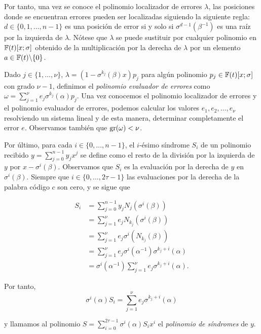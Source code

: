 Por tanto, una vez se conoce el polinomio localizador de errores $\lambda$, las posiciones donde se encuentran errores pueden ser localizadas siguiendo la siguiente regla: $d \in \{0,1,\dots,n-1\}$ es una posición de error si y solo si $\sigma^{d-1}(\beta^{-1})$ es una raíz por la izquierda de $\lambda$. Nótese que $\lambda$ se puede sustituir por cualquier polinomio en $\mathbb{F}(t)[x;\sigma]$ obtenido de la multiplicación por la derecha de $\lambda$ por un elemento $a \in \mathbb{F}(t)\backslash \{0\}$.

Dado $j \in \{1,\dots,\nu\}$, $\lambda = (1 - \sigma^{k_j}(\beta)x)p_j$ para algún polinomio $p_j \in \mathbb{F}(t)[x;\sigma]$ con grado $\nu - 1$, definimos el \emph{polinomio evaluador de errores} como $\omega = \sum_{j=1}^{\nu}e_j\sigma^{k_j}(\alpha)p_j$. Una vez conocemos el polinomio localizador de errores y el polinomio evaluador de errores, podemos calcular los valores $e_1,e_2,\dots,e_\nu$ resolviendo un sistema lineal y de esta manera, determinar completamente el error $e$. Observamos también que $\operatorname{gr}(\omega) < \nu$.

Por último, para cada $i \in \{0,\dots,n-1\}$, el $i$-ésimo síndrome $S_i$ de un polinomio recibido $y = \sum_{j=0}^{n-1}y_jx^j$ se define como el resto de la división por la izquierda de $y$ por $x - \sigma^i(\beta)$. Observamos que $S_i$ es la evaluación por la derecha de $y$ en $\sigma^i(\beta)$. Siempre que $i \in \{0,\dots,2\tau - 1\}$ las evaluaciones por la derecha de la palabra código $c$ son cero, y se sigue que

\begin{align*}
    S_i &= \sum_{j=0}^{n-1}y_jN_j(\sigma^i(\beta)) \\
        &= \sum_{j=1}^{\nu}e_jN_{k_j}(\sigma^i(\beta)) \\
        &= \sum_{j=1}^{\nu}e_j\sigma^i(N_{k_j}(\beta)) \\
        &= \sum_{j=1}^{\nu}e_j\sigma^i(\alpha^{-1})\sigma^{k_j + i}(\alpha) \\
        &= \sigma^i(\alpha^{-1})\sum_{j=1}^{\nu}
        e_j\sigma^{k_j + i}(\alpha).
\end{align*}

Por tanto,         
\begin{equation}\label{eq:6}
\sigma^i(\alpha)S_i = \sum_{j=1}^{\nu}e_j\sigma^{k_j+i}(\alpha)\end{equation} 

y llamamos al polinomio $S = \sum_{i=0}^{2\tau - 1}\sigma^i(\alpha)S_ix^i$ el \emph{polinomio de síndromes} de $y$.

